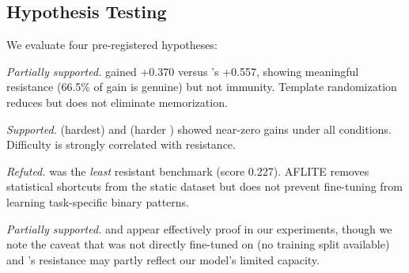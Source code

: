 \subsection{Hypothesis Testing}
\label{sec:hypotheses}

We evaluate four pre-registered hypotheses:

 \emph{Partially supported.} \gsmsym gained +0.370 versus \gsmk's +0.557, showing meaningful resistance (66.5\% of gain is genuine) but not immunity. Template randomization reduces but does not eliminate memorization.

 \emph{Supported.} \gpqa (hardest) and \mmlupro (harder \mmlu) showed near-zero gains under all conditions. Difficulty is strongly correlated with resistance.

 \emph{Refuted.} \wino was the \emph{least} resistant benchmark (score 0.227). AFLITE removes statistical shortcuts from the static dataset but does not prevent fine-tuning from learning task-specific binary patterns.

 \emph{Partially supported.} \gpqa and \mmlupro appear effectively proof in our experiments, though we note the caveat that \gpqa was not directly fine-tuned on (no training split available) and \mmlupro's resistance may partly reflect our model's limited capacity.
